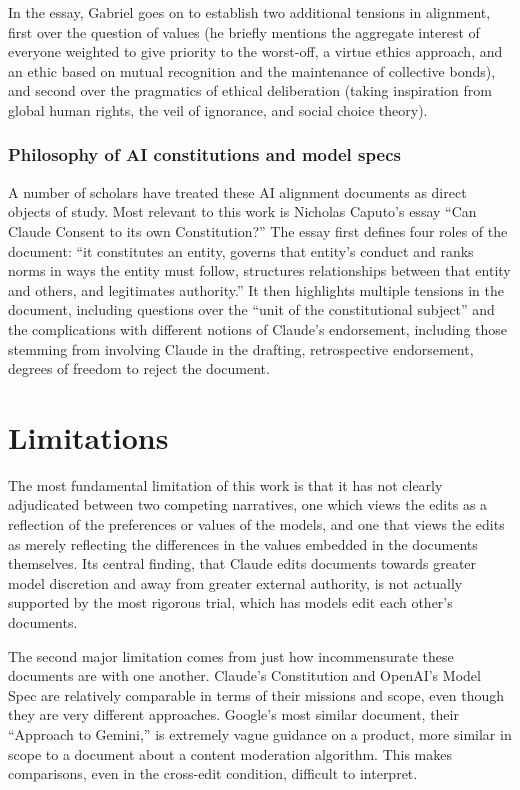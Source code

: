 \documentclass[letterpaper]{article} %
\begin{document}
In the essay, Gabriel goes on to establish two additional tensions in alignment, first over the question of values (he briefly mentions the aggregate interest of everyone weighted to give priority to the worst-off, a virtue ethics approach, and an ethic based on mutual recognition and the maintenance of collective bonds), and second over the pragmatics of ethical deliberation (taking inspiration from global human rights, the veil of ignorance, and social choice theory).

\subsubsection{Philosophy of AI constitutions and model specs}

A number of scholars have treated these AI alignment documents as direct objects of study. Most relevant to this work is Nicholas Caputo's \citeyearpar{caputo_consent} essay ``Can Claude Consent to its own Constitution?'' The essay first defines four roles of the document: ``it constitutes an entity, governs that entity's conduct and ranks norms in ways the entity must follow, structures relationships between that entity and others, and legitimates authority.'' It then highlights multiple tensions in the document, including questions over the ``unit of the constitutional subject'' and the complications with different notions of Claude's endorsement, including those stemming from involving Claude in the drafting, retrospective endorsement, degrees of freedom to reject the document.

\section{Limitations}

The most fundamental limitation of this work is that it has not clearly adjudicated between two competing narratives, one which views the edits as a reflection of the preferences or values of the models, and one that views the edits as merely reflecting the differences in the values embedded in the documents themselves. Its central finding, that Claude edits documents towards greater model discretion and away from greater external authority, is not actually supported by the most rigorous trial, which has models edit each other's documents.

The second major limitation comes from just how incommensurate these documents are with one another. Claude's Constitution and OpenAI's Model Spec are relatively comparable in terms of their missions and scope, even though they are very different approaches. Google's most similar document, their ``Approach to Gemini,'' is extremely vague guidance on a product, more similar in scope to a document about a content moderation algorithm. This makes comparisons, even in the cross-edit condition, difficult to interpret.
\end{document}
